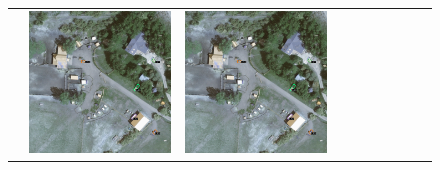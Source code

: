 \begin{figure}[H]
\begin{tabularx}{\textwidth}{c|*{9}{X}}
    & \includegraphics[trim={730pt 220pt 200pt 720pt},clip,width=\linewidth]{images/015Results/02perm_exp/comp_images/rgbndvi/523.png}
    & \includegraphics[trim={850pt 110pt 80pt 830pt},clip,width=\linewidth]{images/015Results/02perm_exp/comp_images/rgbndvi/523.png}

\end{tabularx}
\end{figure}
